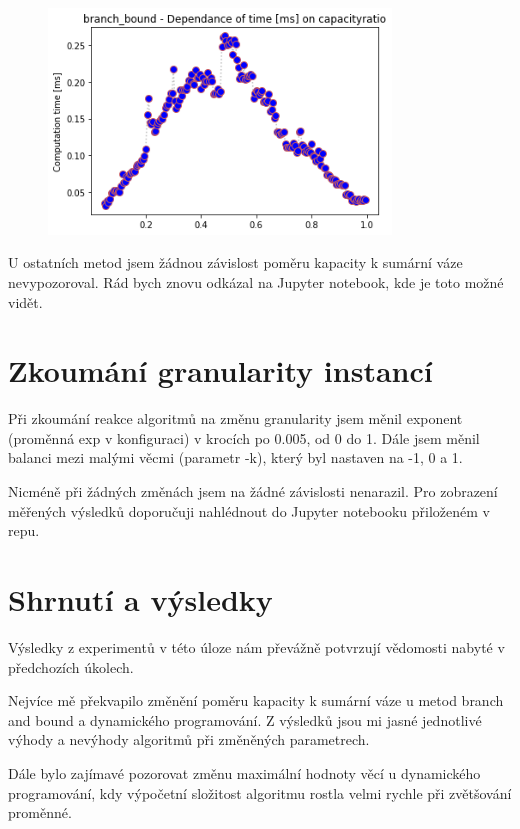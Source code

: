 \documentclass[a4paper,10pt,twocolumn]{article}
\begin{document}
\begin{figure}[H]
  \begin{center}
    \includegraphics[height=6cm]{graphs/time_on_capacityratio_branch_bound.png}
  \end{center}
\end{figure}


U ostatních metod jsem žádnou závislost poměru kapacity k sumární váze nevypozoroval. Rád bych znovu odkázal na Jupyter notebook, kde je toto možné vidět.

\section{Zkoumání granularity instancí}

Při zkoumání reakce algoritmů na změnu granularity jsem měnil exponent (proměnná exp v konfiguraci) v krocích po 0.005, od 0 do 1. Dále jsem měnil balanci mezi malými věcmi (parametr -k), který byl nastaven na -1, 0 a 1.

Nicméně při žádných změnách jsem na žádné závislosti nenarazil. Pro zobrazení měřených výsledků doporučuji nahlédnout do Jupyter notebooku přiloženém v repu.


\section{Shrnutí a výsledky}


Výsledky z experimentů v této úloze nám převážně potvrzují vědomosti nabyté v předchozích úkolech. 

Nejvíce mě překvapilo změnění poměru kapacity k sumární váze u metod branch and bound a dynamického programování. Z výsledků jsou mi jasné jednotlivé výhody a nevýhody algoritmů při změněných parametrech.

Dále bylo zajímavé pozorovat změnu maximální hodnoty věcí u dynamického programování, kdy výpočetní složitost algoritmu rostla velmi rychle při zvětšování proměnné.
\end{document}
